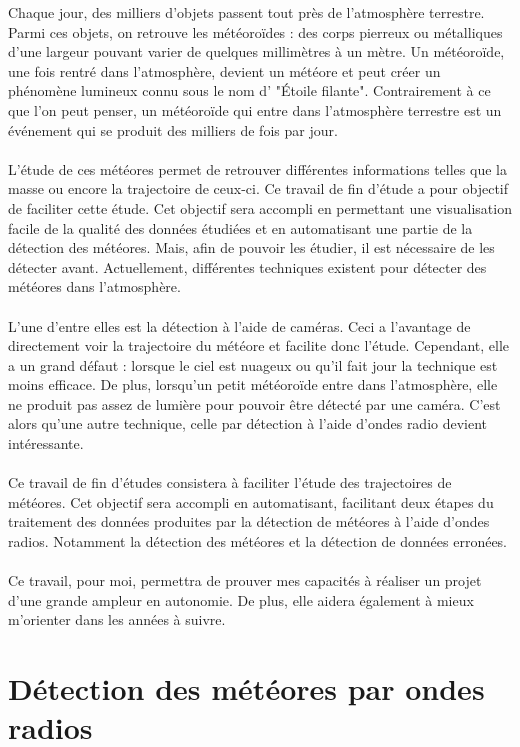 \documentclass[11pt]{article}
\begin{document}
Chaque jour, des milliers d'objets passent tout près de l'atmosphère terrestre.
Parmi ces objets, on retrouve les météoroïdes : des corps pierreux ou métalliques d'une largeur pouvant varier de quelques millimètres à un mètre.
Un météoroïde, une fois rentré dans l'atmosphère, devient un météore et peut créer un phénomène lumineux connu sous le nom d' "Étoile filante".
Contrairement à ce que l'on peut penser, un météoroïde qui entre dans l'atmosphère terrestre est un événement qui se produit des milliers de fois par jour.
\\
\\
L'étude de ces météores permet de retrouver différentes informations telles que la masse ou encore la trajectoire de ceux-ci.
Ce travail de fin d'étude a pour objectif de faciliter cette étude.
Cet objectif sera accompli en permettant une visualisation facile de la qualité des données étudiées et en automatisant une partie de la détection des météores.
Mais, afin de pouvoir les étudier, il est nécessaire de les détecter avant.
Actuellement, différentes techniques existent pour détecter des météores dans l'atmosphère.
\\
\\
L'une d'entre elles est la détection à l'aide de caméras.
Ceci a l'avantage de directement voir la trajectoire du météore et facilite donc l'étude.
Cependant, elle a un grand défaut : lorsque le ciel est nuageux ou qu'il fait jour la technique est moins efficace.
De plus, lorsqu'un petit météoroïde entre dans l'atmosphère, elle ne produit pas assez de lumière pour pouvoir être détecté par une caméra.
C'est alors qu'une autre technique, celle par détection à l'aide d'ondes radio devient intéressante.
\\
\\
Ce travail de fin d'études consistera à faciliter l'étude des trajectoires de météores.
Cet objectif sera accompli en automatisant, facilitant deux étapes du traitement des données produites par la détection de météores à l'aide d'ondes radios.
Notamment la détection des météores et la détection de données erronées.\\
\\
Ce travail, pour moi, permettra de prouver mes capacités à réaliser un projet d'une grande ampleur en autonomie.
De plus, elle aidera également à mieux m'orienter dans les années à suivre.

\newpage

\section{Détection des météores par ondes radios}
\end{document}
